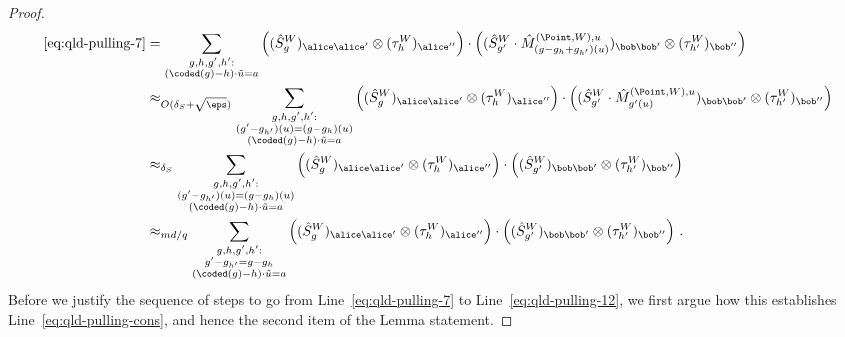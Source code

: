 \begin{proof}
\begin{align}
		\text{\eqref{eq:qld-pulling-7}} &=\sum_{\substack{g,h,g',h': \\ (\coded(g)-h)\cdot \tilde{u} = a}} \Big((\hat{S}^W_g)_{\alice \alice'} \otimes (\tau_h^W)_{\alice''} \Big) \cdot \Big( (\hat{S}^W_{g'} \cdot \hat{M}^{(\Point,W),u}_{(g-g_h+g_{h'})(u)})_{\bob \bob'} \otimes (\tau_{h'}^W)_{\bob''} \Big) \label{eq:qld-pulling-9a} \\
		&\approx_{O(\delta_S + \sqrt{\eps})} \sum_{\substack{g,h,g',h': \\ (g' - g_{h'})(u) = (g -g_h)(u) \\ (\coded(g)-h)\cdot \tilde{u} = a}} \Big((\hat{S}^W_g)_{\alice \alice'} \otimes (\tau_h^W)_{\alice''} \Big) \cdot \Big( (\hat{S}^W_{g'} \cdot \hat{M}^{(\Point,W),u}_{g'(u)})_{\bob \bob'} \otimes (\tau_{h'}^W)_{\bob''} \Big) \label{eq:qld-pulling-10} \\
		&\approx_{\delta_S} \sum_{\substack{g,h,g',h': \\ (g' - g_{h'})(u) = (g -g_h)(u) \\ (\coded(g)-h)\cdot \tilde{u} = a}} \Big((\hat{S}^W_g)_{\alice \alice'} \otimes (\tau_h^W)_{\alice''} \Big) \cdot \Big( (\hat{S}^W_{g'})_{\bob \bob'} \otimes (\tau_{h'}^W)_{\bob''} \Big) \label{eq:qld-pulling-11} \\
		&\approx_{md/q} \sum_{\substack{g,h,g',h': \\ g' - g_{h'} = g -g_h \\ (\coded(g)-h)\cdot \tilde{u} = a}} \Big((\hat{S}^W_g)_{\alice \alice'} \otimes (\tau_h^W)_{\alice''} \Big) \cdot \Big( (\hat{S}^W_{g'})_{\bob \bob'} \otimes (\tau_{h'}^W)_{\bob''} \Big)~. \label{eq:qld-pulling-12}
		\end{align}
		Before we justify the sequence of steps to go from Line~\eqref{eq:qld-pulling-7} to Line~\eqref{eq:qld-pulling-12}, we first argue how this establishes Line~\eqref{eq:qld-pulling-cons}, and hence the second item of the Lemma statement.
		

\end{proof}
